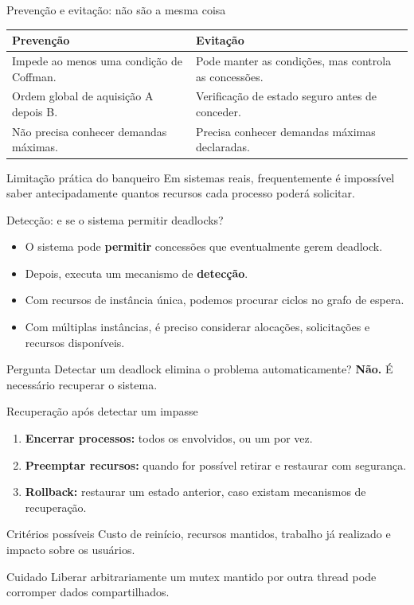\documentclass[aspectratio=169,11pt]{beamer}
\begin{document}
\begin{frame}{Prevenção e evitação: não são a mesma coisa}
\small
\begin{tabular}{p{4.45cm}p{5.5cm}}
\toprule
\textbf{Prevenção} & \textbf{Evitação}\\
\midrule
Impede ao menos uma condição de Coffman. & Pode manter as condições, mas controla as concessões.\\[.2cm]
Ordem global de aquisição A depois B. & Verificação de estado seguro antes de conceder.\\[.2cm]
Não precisa conhecer demandas máximas. & Precisa conhecer demandas máximas declaradas.\\
\bottomrule
\end{tabular}
\vspace{.45cm}
\begin{block}{Limitação prática do banqueiro}
Em sistemas reais, frequentemente é impossível saber antecipadamente quantos recursos cada processo poderá solicitar.
\end{block}
\end{frame}

\begin{frame}{Detecção: e se o sistema permitir deadlocks?}
\small
\begin{itemize}
\setlength\itemsep{.65em}
\item O sistema pode \textbf{permitir} concessões que eventualmente gerem deadlock.
\item Depois, executa um mecanismo de \textbf{detecção}.
\item Com recursos de instância única, podemos procurar ciclos no grafo de espera.
\item Com múltiplas instâncias, é preciso considerar alocações, solicitações e recursos disponíveis.
\end{itemize}
\begin{alertblock}{Pergunta}
Detectar um deadlock elimina o problema automaticamente? \textbf{Não.} É necessário recuperar o sistema.
\end{alertblock}
\end{frame}

\begin{frame}{Recuperação após detectar um impasse}
\small
\begin{enumerate}
\setlength\itemsep{.65em}
\item \textbf{Encerrar processos:} todos os envolvidos, ou um por vez.
\item \textbf{Preemptar recursos:} quando for possível retirar e restaurar com segurança.
\item \textbf{Rollback:} restaurar um estado anterior, caso existam mecanismos de recuperação.
\end{enumerate}
\begin{block}{Critérios possíveis}
Custo de reinício, recursos mantidos, trabalho já realizado e impacto sobre os usuários.
\end{block}
\begin{alertblock}{Cuidado}
Liberar arbitrariamente um mutex mantido por outra thread pode corromper dados compartilhados.
\end{alertblock}
\end{frame}
\end{document}
